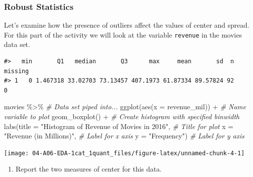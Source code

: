 \documentclass[
]{report}
\newenvironment{Shaded}{\begin{snugshade}}{\end{snugshade}}
\newcommand{\AttributeTok}[1]{\textcolor[rgb]{0.77,0.63,0.00}{#1}}
\newcommand{\CommentTok}[1]{\textcolor[rgb]{0.56,0.35,0.01}{\textit{#1}}}
\newcommand{\FunctionTok}[1]{\textcolor[rgb]{0.00,0.00,0.00}{#1}}
\newcommand{\NormalTok}[1]{#1}
\newcommand{\SpecialCharTok}[1]{\textcolor[rgb]{0.00,0.00,0.00}{#1}}
\newcommand{\StringTok}[1]{\textcolor[rgb]{0.31,0.60,0.02}{#1}}
\providecommand{\tightlist}{%
  \setlength{\itemsep}{0pt}\setlength{\parskip}{0pt}}
\begin{document}
\vspace{0.4in}

\hypertarget{robust-statistics}{%
\subsubsection*{Robust Statistics}\label{robust-statistics}}

Let's examine how the presence of outliers affect the values of center and spread. For this part of the activity we will look at the variable \texttt{revenue} in the movies data set.

\begin{verbatim}
#>   min       Q1   median       Q3      max     mean       sd  n missing
#> 1   0 1.467318 33.02703 73.13457 407.1973 61.87334 89.57824 92       0
\end{verbatim}

\begin{Shaded}
\begin{Highlighting}[]
\NormalTok{movies }\SpecialCharTok{\%\textgreater{}\%} \CommentTok{\# Data set piped into...}
\FunctionTok{ggplot}\NormalTok{(}\FunctionTok{aes}\NormalTok{(}\AttributeTok{x =}\NormalTok{ revenue\_mil)) }\SpecialCharTok{+}   \CommentTok{\# Name variable to plot}
  \FunctionTok{geom\_boxplot}\NormalTok{() }\SpecialCharTok{+}  \CommentTok{\# Create histogram with specified binwidth}
  \FunctionTok{labs}\NormalTok{(}\AttributeTok{title =} \StringTok{"Histogram of Revenue of Movies in 2016"}\NormalTok{, }\CommentTok{\# Title for plot}
       \AttributeTok{x =} \StringTok{"Revenue (in Millions)"}\NormalTok{, }\CommentTok{\# Label for x axis}
       \AttributeTok{y =} \StringTok{"Frequency"}\NormalTok{) }\CommentTok{\# Label for y axis}
\end{Highlighting}
\end{Shaded}

\begin{center}\texttt{[image: 04-A06-EDA-1cat\_1quant\_files/figure-latex/unnamed-chunk-4-1]} \end{center}

\begin{enumerate}
\def\labelenumi{\arabic{enumi}.}
\setcounter{enumi}{7}
\tightlist
\item
  Report the two measures of center for this data.
\end{enumerate}

\vspace{0.8in}
\end{document}
